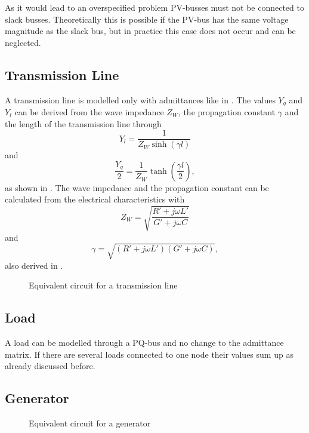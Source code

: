 As it would lead to an overspecified problem PV-busses must not be connected to slack busses. Theoretically this is possible if the PV-bus has the same voltage magnitude as the slack bus, but in practice this case does not occur and can be neglected.

\subsection{Transmission Line}
A transmission line is modelled only with admittances like in . The values $Y_q$ and $Y_l$ can be derived from the wave impedance $Z_W$, the propagation constant $\gamma$ and the length of the transmission line through
\begin{equation}
	Y_l = \frac{1}{Z_W \sinh \left( \gamma l \right)}
\end{equation}
and
\begin{equation}
	\frac{Y_q}{2} = \frac{1}{Z_W} \tanh \left( \frac{\gamma l}{2} \right),
\end{equation}
as shown in \citep[p. 155]{powerSystemAnalysis}. The wave impedance and the propagation constant can be calculated from the electrical characteristics with
\begin{equation}
	Z_W = \sqrt{\frac{R' + j \omega L'}{G' + j \omega C}}
\end{equation}
and 
\begin{equation}
	\gamma = \sqrt{\left( R' + j \omega L' \right) \left( G' + j \omega C \right)},
\end{equation}
also derived in \citep[p. 153]{powerSystemAnalysis}.

\begin{figure}
	\centering
	
	\caption{Equivalent circuit for a transmission line}
	\label{fig:transmission_line}
\end{figure}

\subsection{Load}
A load can be modelled through a PQ-bus and no change to the admittance matrix. If there are several loads connected to one node their values sum up as already discussed before.

\subsection{Generator}

\begin{figure}
	\centering
	
	\caption{Equivalent circuit for a generator}
	\label{fig:generator}
\end{figure}


